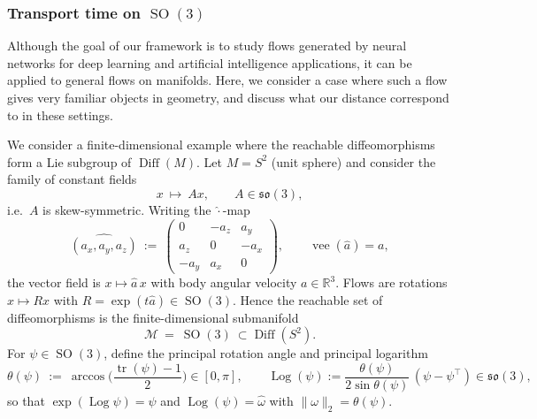 \documentclass[12pt]{amsart}
\numberwithin{equation}{section}
\theoremstyle{remark}
\newcommand{\ql}[1]{\texttt{\color{cyan} QL: \footnotesize #1}}
\begin{document}
\subsubsection{Transport time on \(\operatorname{SO}(3)\)}
Although the goal of our framework is to study flows generated by neural networks for 
deep learning and artificial intelligence applications, it can be applied to general flows on manifolds.
Here, we consider a case where such a flow gives very familiar objects in geometry,
and discuss what our distance correspond to in these settings.

We consider a finite-dimensional example where the reachable diffeomorphisms form a Lie subgroup of \(\operatorname{Diff}(M)\). Let \(M=S^2\) (unit sphere) and consider the family of constant fields
\begin{equation}
x\ \mapsto\ A x,\qquad A\in \mathfrak{so}(3),
\end{equation}
i.e.\ \(A\) is skew-symmetric. Writing the \(\hat{\cdot}\)-map
\begin{equation}
\widehat{(a_x,a_y,a_z)}\ :=\
\begin{pmatrix}
0&-a_z&a_y\\
a_z&0&-a_x\\
-a_y&a_x&0
\end{pmatrix},
\qquad \operatorname{vee}(\hat a)=a,
\end{equation}
the vector field is \(x\mapsto \hat a\,x\) with body angular velocity \(a\in\mathbb R^3\).
Flows are rotations \(x\mapsto R x\) with \(R=\exp(t\hat a)\in \operatorname{SO}(3)\).
Hence the reachable set of diffeomorphisms is the finite-dimensional submanifold
\[
\mathcal M\ =\ \operatorname{SO}(3)\ \subset \operatorname{Diff}(S^2).
\]
For \(\psi\in\operatorname{SO}(3)\), define the principal rotation angle and principal logarithm
\begin{equation}
\theta(\psi)\ :=\ \arccos\!\Big(\frac{\operatorname{tr}(\psi)-1}{2}\Big)\in[0,\pi],\qquad
\operatorname{Log}(\psi):=\frac{\theta(\psi)}{2\sin\theta(\psi)}\,(\psi-\psi^\top)\in\mathfrak{so}(3),
\end{equation}
so that \(\exp(\operatorname{Log}\psi)=\psi\) and \(\operatorname{Log}(\psi)=\hat{\omega}\) with \(\|\omega\|_2=\theta(\psi)\).
\end{document}
